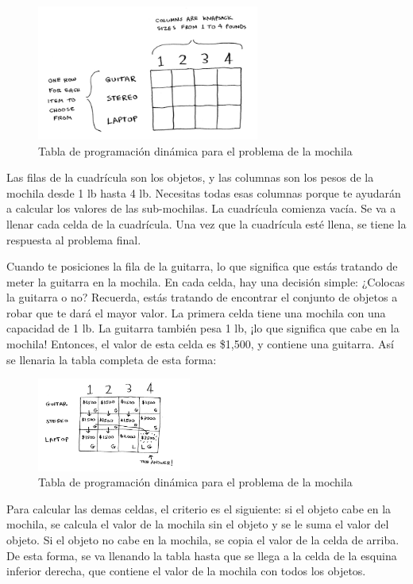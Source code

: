 \newpage
\begin{figure}[h]
    \centering
    \includegraphics[width=0.65\textwidth]{estáticos/figura14.png}
    \caption{Tabla de programación dinámica para el problema de la mochila}
\end{figure}

Las filas de la cuadrícula son los objetos, y las columnas son los pesos de la mochila desde 1 lb hasta 4 lb. Necesitas todas esas columnas porque te ayudarán a calcular los valores de las sub-mochilas. La cuadrícula comienza vacía. Se va a llenar cada celda de la cuadrícula. Una vez que la cuadrícula esté llena, se tiene la respuesta al problema final.

Cuando te posiciones la fila de la guitarra, lo que significa que estás tratando de meter la guitarra en la mochila. En cada celda, hay una decisión simple: ¿Colocas la guitarra o no? Recuerda, estás tratando de encontrar el conjunto de objetos a robar que te dará el mayor valor.
La primera celda tiene una mochila con una capacidad de 1 lb. La guitarra también pesa 1 lb, ¡lo que significa que cabe en la mochila! Entonces, el valor de esta celda es \$1,500, y contiene una guitarra. Así se llenaria la tabla completa de esta forma:

\begin{figure}[h]
    \centering
    \includegraphics[width=0.45\textwidth]{estáticos/figura15.png}
    \caption{Tabla de programación dinámica para el problema de la mochila}
\end{figure}

Para calcular las demas celdas, el criterio es el siguiente: si el objeto cabe en la mochila, se calcula el valor de la mochila sin el objeto y se le suma el valor del objeto. Si el objeto no cabe en la mochila, se copia el valor de la celda de arriba. De esta forma, se va llenando la tabla hasta que se llega a la celda de la esquina inferior derecha, que contiene el valor de la mochila con todos los objetos.


